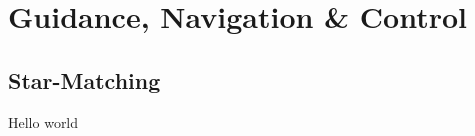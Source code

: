 \chapter{Guidance, Navigation \& Control}
\thispagestyle{fancy}

\section{Star-Matching}
\blindtext


Hello world


